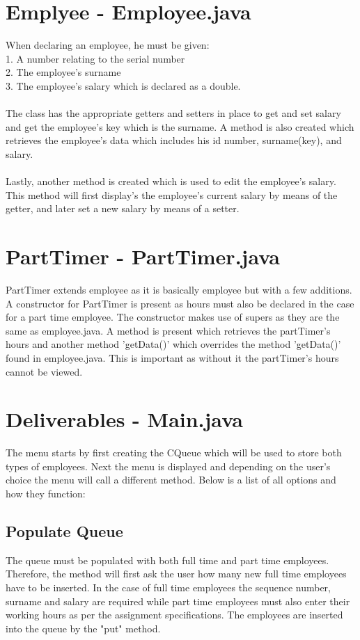 \documentclass[a4paper]{article}
\begin{document}

\section{Emplyee - Employee.java}

When declaring an employee, he must be given:
\\1. A number relating to the serial number
\\2. The employee's surname
\\3. The employee's salary which is declared as a double.\\
\\The class has the appropriate getters and setters in place to get and set salary and get the employee's key which is the surname. A method is also created which retrieves the employee's data which includes his id number, surname(key), and salary.\\
\\Lastly, another method is created which is used to edit the employee's salary. This method will first display's the employee's current salary by means of the getter, and later set a new salary by means of a setter.
\bigskip 

\section{PartTimer - PartTimer.java}
PartTimer extends employee as it is basically employee but with a few additions. A constructor for PartTimer is present as hours must also be declared in the case for a part time employee. The constructor makes use of supers as they are the same as employee.java. A method is present which retrieves the partTimer's hours and another method 'getData()' which overrides the method 'getData()' found in employee.java. This is important as without it the partTimer's hours cannot be viewed.
\bigskip

\section{Deliverables - Main.java}
The menu starts by first creating the CQueue which will be used to store both types of employees. Next the menu is displayed and depending on the user's choice the menu will call a different method. Below is a list of all options and how they function:
\subsection{Populate Queue}
The queue must be populated with both full time and part time employees. Therefore, the method will first ask the user how many new full time employees have to be inserted. In the case of full time employees the sequence number, surname and salary are required while part time employees must also enter their working hours as per the assignment specifications. The employees are inserted into the queue by the "put" method.
\end{document}
